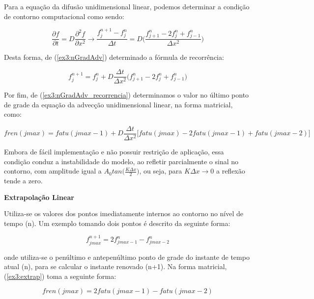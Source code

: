\documentclass[11pt]{article}
\begin{document}
Para a equação da difusão unidimensional linear, podemos determinar a
condição de contorno computacional como sendo:

\begin{equation}
    \frac{\partial{f}}{\partial{t}} = D\frac{\partial^2{f}}{\partial{x^2}} \longrightarrow \frac{f^{n+1}_{j} - f^{n}_{j}}{\Delta{t}} = D\bigg( \frac{f^{n}_{j+1} -2f^{n}_{j} + f^{n}_{j-1}}{\Delta{x^2}} \bigg)
    \label{ex3:nGradAdv}
\end{equation}

Desta forma, de (\ref{ex3:nGradAdv}) determinado a fórmula de
recorrência:

\begin{equation}
    f^{n+1}_{j} = f^{n}_{j} + D\frac{\Delta{t}}{\Delta{x^2}}\bigg( f^{n}_{j+1} -2f^{n}_{j} + f^{n}_{j-1} \bigg)
    \label{ex3:nGradAdv_recorrencia}
\end{equation}

Por fim, de (\ref{ex3:nGradAdv_recorrencia}) determinamos o valor no
último ponto de grade da equação da advecção unidimensional linear, na
forma matricial, como:

\begin{equation}
    fren(jmax) = fatu(jmax-1) + D\frac{\Delta{t}}{\Delta{x^2}}\biggr[fatu(jmax) -2fatu(jmax-1) +fatu(jmax-2) \biggr]
\end{equation}

Embora de fácil implementação e não possuir restrição de aplicação, essa
condição conduz a instabilidade do modelo, ao refletir parcialmente o
sinal no contorno, com amplitude igual a
\(A_0tan\bigg( \frac{K\Delta{x}}{2} \bigg)\), ou seja, para
\(K\Delta{x} \longrightarrow 0\) a reflexão tende a zero.

\textbf{Extrapolação Linear}

Utiliza-se os valores dos pontos imediatamente internos ao contorno no
nível de tempo (n). Um exemplo tomando dois pontos é descrito da
seguinte forma:

\begin{equation}
    f^{n+1}_{jmax} = 2f^{n}_{jmax-1} - f^{n}_{jmax-2}
    \label{ex3:extrap}
\end{equation}

onde utiliza-se o penúltimo e antepenúltimo ponto de grade do instante
de tempo atual (n), para se calcular o instante renovado (n+1). Na forma
matricial, (\ref{ex3:extrap}) toma a seguinte forma:

\begin{equation}
    fren(jmax) = 2fatu(jmax-1) - fatu(jmax-2)
\end{equation}
\end{document}
